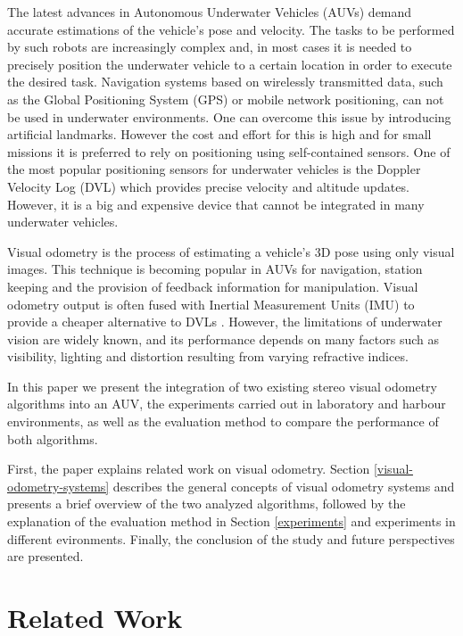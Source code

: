 \documentclass[conference]{IEEEtran}
\begin{document}
The latest advances in Autonomous Underwater Vehicles (AUVs) demand accurate estimations of the vehicle's pose and velocity. The tasks to be performed by such robots are increasingly complex and, in most cases it is needed to precisely position the underwater vehicle to a certain location in order to execute the desired task. Navigation systems based on wirelessly transmitted data, such as the Global Positioning System (GPS) or mobile network positioning, can not be used in underwater environments. One can overcome this issue by introducing artificial landmarks. However the cost and effort for this is high and for small missions it is preferred to rely on positioning using self-contained sensors. One of the most popular positioning sensors for underwater vehicles is the Doppler Velocity Log (DVL) which provides precise velocity and altitude updates. However, it is a big and expensive device that cannot be integrated in many underwater vehicles.

Visual odometry is the process of estimating a vehicle's 3D pose using only visual images. This technique is becoming popular in AUVs for navigation, station keeping and the provision of feedback information for manipulation. Visual odometry output is often fused with Inertial Measurement Units (IMU) to provide a cheaper alternative to DVLs \cite{Hildebrandt2010,Dunbabin2004}. However, the limitations of underwater vision are widely known, and its performance depends on many factors such as visibility, lighting and distortion resulting from varying refractive indices.

In this paper we present the integration of two existing stereo visual odometry algorithms into an AUV, the experiments carried out in laboratory and harbour environments, as well as the evaluation method to compare the performance of both algorithms.

First, the paper explains related work on visual odometry. Section \ref{visual-odometry-systems} describes the general concepts of visual odometry systems and presents a brief overview of the two analyzed algorithms, followed by the explanation of the evaluation method in Section \ref{experiments} and experiments in different evironments. Finally, the conclusion of the study and future perspectives are presented.

\section{Related Work 
  \label{related-work}
}
\end{document}
